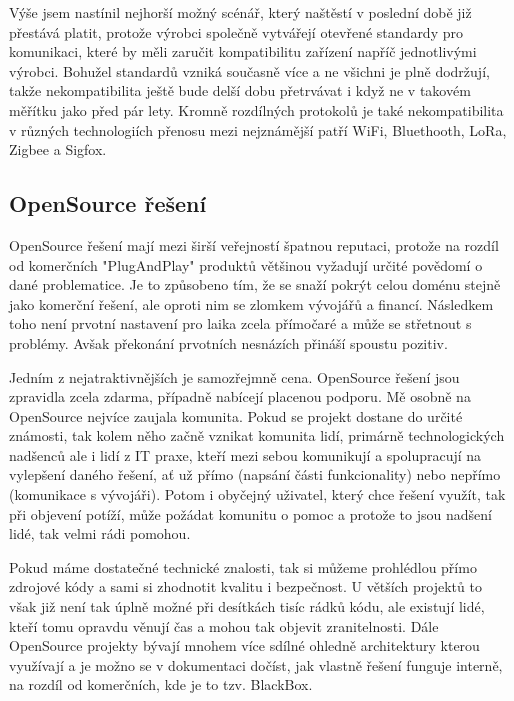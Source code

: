 \documentclass[thesis=B,czech]{FITthesis}[2019/12/23]
\begin{document}
Výše jsem nastínil nejhorší možný scénář, který naštěstí v poslední době již přestává platit, protože výrobci společně vytvářejí otevřené standardy pro komunikaci, které by měli zaručit kompatibilitu zařízení napříč jednotlivými výrobci. Bohužel standardů vzniká současně více a ne všichni je plně dodržují, takže nekompatibilita ještě bude delší dobu přetrvávat i když ne v takovém měřítku jako před pár lety. Kromně rozdílných protokolů je také nekompatibilita v různých technologiích přenosu mezi nejznámější patří WiFi, Bluethooth, LoRa, Zigbee a Sigfox. 

\subsection{OpenSource řešení}
OpenSource řešení mají mezi širší veřejností špatnou reputaci, protože na rozdíl od komerčních "PlugAndPlay" produktů většinou vyžadují určité povědomí o dané problematice. Je to způsobeno tím, že se snaží pokrýt celou doménu stejně jako komerční řešení, ale oproti nim se zlomkem vývojářů a financí. Následkem toho není prvotní nastavení pro laika zcela přímočaré a může se střetnout s problémy. Avšak překonání prvotních nesnázích přináší spoustu pozitiv. 

Jedním z nejatraktivnějších je samozřejmně cena. OpenSource řešení jsou zpravidla zcela zdarma, případně nabícejí placenou podporu. Mě osobně na OpenSource nejvíce zaujala komunita. Pokud se projekt dostane do určité známosti, tak kolem něho začně vznikat komunita lidí, primárně technologických nadšenců ale i lidí z IT praxe, kteří mezi sebou komunikují a spolupracují na vylepšení daného řešení, ať už přímo (napsání části funkcionality) nebo nepřímo (komunikace s vývojáři). Potom i obyčejný uživatel, který chce řešení využít, tak při objevení potíží, může požádat komunitu o pomoc a protože to jsou nadšení lidé, tak velmi rádi pomohou. 

Pokud máme dostatečné technické znalosti, tak si můžeme prohlédlou přímo zdrojové kódy a sami si zhodnotit kvalitu i bezpečnost. U větších projektů to však již není tak úplně možné při desítkách tisíc rádků kódu, ale existují lidé, kteří tomu opravdu věnují čas a mohou tak objevit zranitelnosti. Dále OpenSource projekty bývají mnohem více sdílné ohledně architektury kterou využívají a je možno se v dokumentaci dočíst, jak vlastně řešení funguje interně, na rozdíl od komerčních, kde je to tzv. BlackBox.
\end{document}
